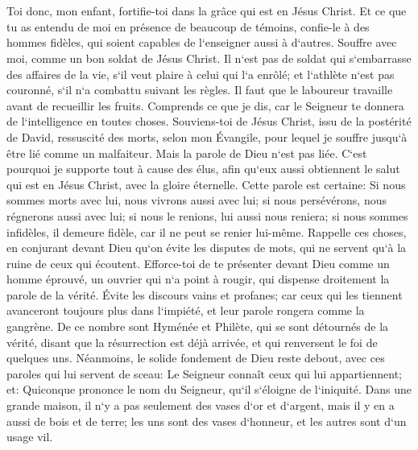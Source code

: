 \chapter{}

\verse Toi donc, mon enfant, fortifie-toi dans la grâce qui est en Jésus Christ. 
\verse Et ce que tu as entendu de moi en présence de beaucoup de témoins, confie-le à des hommes fidèles, qui soient capables de l`enseigner aussi à d`autres. 
\verse Souffre avec moi, comme un bon soldat de Jésus Christ. 
\verse Il n`est pas de soldat qui s`embarrasse des affaires de la vie, s`il veut plaire à celui qui l`a enrôlé; 
\verse et l`athlète n`est pas couronné, s`il n`a combattu suivant les règles. 
\verse Il faut que le laboureur travaille avant de recueillir les fruits. 
\verse Comprends ce que je dis, car le Seigneur te donnera de l`intelligence en toutes choses. 
\verse Souviens-toi de Jésus Christ, issu de la postérité de David, ressuscité des morts, selon mon Évangile, 
\verse pour lequel je souffre jusqu`à être lié comme un malfaiteur. Mais la parole de Dieu n`est pas liée. 
\verse C`est pourquoi je supporte tout à cause des élus, afin qu`eux aussi obtiennent le salut qui est en Jésus Christ, avec la gloire éternelle. 
\verse Cette parole est certaine: Si nous sommes morts avec lui, nous vivrons aussi avec lui; 
\verse si nous persévérons, nous régnerons aussi avec lui; si nous le renions, lui aussi nous reniera; 
\verse si nous sommes infidèles, il demeure fidèle, car il ne peut se renier lui-même. 
\verse Rappelle ces choses, en conjurant devant Dieu qu`on évite les disputes de mots, qui ne servent qu`à la ruine de ceux qui écoutent. 
\verse Efforce-toi de te présenter devant Dieu comme un homme éprouvé, un ouvrier qui n`a point à rougir, qui dispense droitement la parole de la vérité. 
\verse Évite les discours vains et profanes; car ceux qui les tiennent avanceront toujours plus dans l`impiété, et leur parole rongera comme la gangrène. 
\verse De ce nombre sont Hyménée et Philète, 
\verse qui se sont détournés de la vérité, disant que la résurrection est déjà arrivée, et qui renversent le foi de quelques uns. 
\verse Néanmoins, le solide fondement de Dieu reste debout, avec ces paroles qui lui servent de sceau: Le Seigneur connaît ceux qui lui appartiennent; et: Quiconque prononce le nom du Seigneur, qu`il s`éloigne de l`iniquité. 
\verse Dans une grande maison, il n`y a pas seulement des vases d`or et d`argent, mais il y en a aussi de bois et de terre; les uns sont des vases d`honneur, et les autres sont d`un usage vil. 
